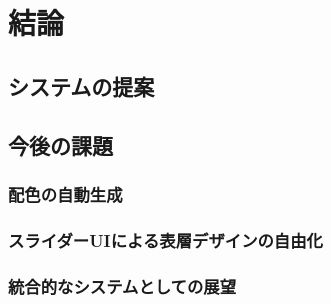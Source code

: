 \chapter{結論}
\label{chap:conclusion}

\section{システムの提案}

\section{今後の課題}
\subsection{配色の自動生成}
\subsection{スライダーUIによる表層デザインの自由化}
\subsection{統合的なシステムとしての展望}
